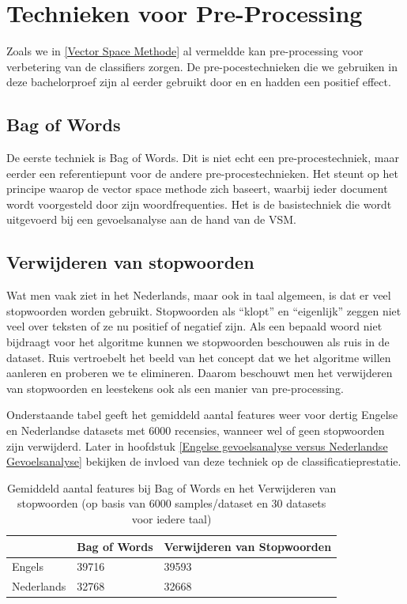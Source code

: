 \section{Technieken voor Pre-Processing}\label{Technieken voor Pre-Processing}

Zoals we in \ref{Vector Space Methode} al vermeldde kan pre-processing voor verbetering van de classifiers zorgen. De pre-pocestechnieken die we gebruiken in deze bachelorproef zijn al eerder gebruikt door \cite{pang2002thumbs} en \cite{wang2011sentiment} en hadden een positief effect.

\subsection{Bag of Words}\label{Bag of Words}

De eerste techniek is Bag of Words. Dit is niet echt een pre-procestechniek, maar eerder een referentiepunt voor de andere pre-procestechnieken. Het steunt op het principe waarop de vector space methode zich baseert, waarbij ieder document wordt voorgesteld door zijn woordfrequenties. Het is de basistechniek die wordt uitgevoerd bij een gevoelsanalyse aan de hand van de VSM. 

\subsection{Verwijderen van stopwoorden}\label{Verwijderen van stopwoorden en leestekens}

Wat men vaak ziet in het Nederlands, maar ook in taal algemeen, is dat er veel stopwoorden worden gebruikt. Stopwoorden als ``klopt'' en ``eigenlijk'' zeggen niet veel over teksten of ze nu positief of negatief zijn. Als een bepaald woord niet bijdraagt voor het algoritme kunnen we stopwoorden beschouwen als ruis in de dataset. Ruis vertroebelt het beeld van het concept dat we het algoritme willen aanleren en proberen we te elimineren. Daarom beschouwt men het verwijderen van stopwoorden en leestekens ook als een manier van pre-processing.

Onderstaande tabel geeft het gemiddeld aantal features weer voor dertig Engelse en Nederlandse datasets met 6000 recensies, wanneer wel of geen stopwoorden zijn verwijderd. Later in hoofdstuk \ref{Engelse gevoelsanalyse versus Nederlandse Gevoelsanalyse} bekijken de invloed van deze techniek op de classificatieprestatie.

\begin{table}[h]
\centering
\begin{tabular}{|l|l|l|}
\hline
           & Bag of Words & Verwijderen van Stopwoorden \\ \hline
Engels     &      39716   &           39593             \\ \hline
Nederlands &      32768    &          32668              \\ \hline
\end{tabular}
\caption{Gemiddeld aantal features bij Bag of Words en het Verwijderen van stopwoorden (op basis van 6000 samples/dataset en 30 datasets voor iedere taal)}
\end{table}

